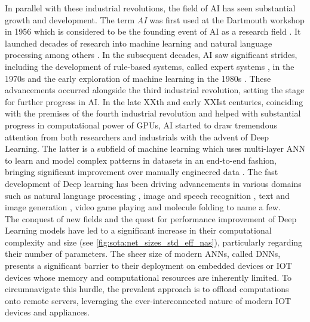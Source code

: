 In parallel with these industrial revolutions, the field of \ac{AI} has seen
substantial growth and development. The term \emph{\acl{AI}} was first used at
the Dartmouth workshop in 1956 which is considered to be the founding event of
\ac{AI} as a research field \cite{dartmouth1956}. It launched decades of
research into machine learning and natural language processing among others
\cite{nilsson1998artificial}. In the subsequent decades, \ac{AI} saw significant
strides, including the development of rule-based systems, called expert systems
\cite{giarratano1994expert}, in the 1970s and the early exploration of machine
learning in the 1980s \cite{rumelhart1986learning}. These advancements occurred
alongside the third industrial revolution, setting the stage for further
progress in \ac{AI}. In the late XXth and early XXIst centuries, coinciding with
the premises of the fourth industrial revolution and helped with substantial
progress in computational power of \acp{GPU}, \ac{AI} started to draw tremendous
attention from both researchers and industrials with the advent of Deep
Learning. The latter is a subfield of machine learning which uses multi-layer
\ac{ANN} to learn and model complex patterns in datasets in an end-to-end
fashion, bringing significant improvement over manually engineered data
\DIFdelbegin {}\DIFdelend \DIFaddbegin {}\DIFaddend . The fast development of Deep learning has been driving advancements
in various domains such as natural language processing
\cite{DBLP:conf/emnlp/BudzianowskiV19,DBLP:conf/naacl/DevlinCLT19,DBLP:conf/nips/VaswaniSPUJGKP17},
image and speech recognition
\cite{DBLP:conf/nips/KrizhevskySH12,DBLP:journals/corr/SimonyanZ14a,DBLP:conf/cvpr/HeZRS16,DBLP:journals/corr/HannunCCCDEPSSCN14,DBLP:conf/icassp/ChanJLV16,DBLP:conf/icml/AmodeiABCCCCCCD16},
text and image generation
\cite{goodfellow2020generative,karras2019style,DBLP:conf/emnlp/BudzianowskiV19},
video game playing \cite{silver2016mastering,silver2018general} and molecule
folding \cite{jumper2021highly} to name a few.\\


The conquest of new fields and the quest for performance improvement of Deep
Learning models have led to a significant increase in their computational
complexity and size (see \cref{fig:sota:net_sizes_std_eff_nas}), particularly
regarding their number of parameters. The sheer size of modern \acp{ANN}, called
\acp{DNN}, presents a significant barrier to their deployment on embedded
devices or \ac{IOT} devices whose memory and computational resources are
inherently limited. To circumnavigate this hurdle, the prevalent approach is to
offload computations onto remote servers, leveraging the ever-interconnected
nature of modern \ac{IOT} devices and appliances.\\

